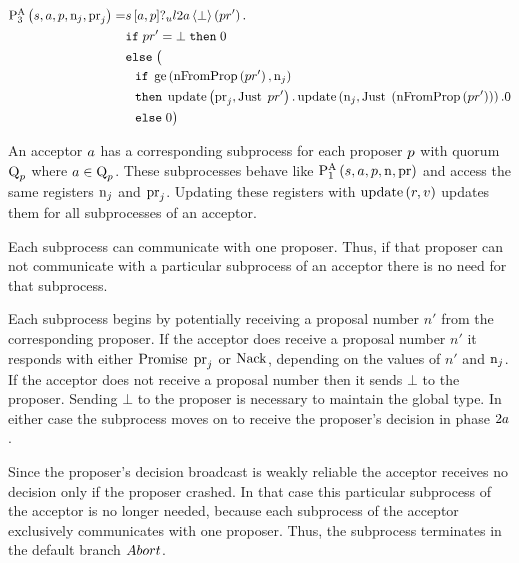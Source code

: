 \begin{align*}
\textstyle\operatorname{P^{A}_{3}}\left(
    s,
    a,
    p,
    \operatorname{n}_{j},
    \operatorname{pr}_{j}
\right) =
&
    s\left[a, p\right]?_u l2a \left\langle \bot \right\rangle \left(pr'\right).\\
&
    \mathtt{if}\; pr' = \bot \;\mathtt{then}\; 0\\
&
    \mathtt{else}\;
\big(
    \\
&\hspace*{0.75em * 1}
    \mathtt{if}\; \operatorname{ge}\left(\operatorname{nFromProp}\left(pr' \right), \operatorname{n}_{j}\right)\\
&\hspace*{0.75em * 1}
    \mathtt{then}\;
        \operatorname{update} \left(\operatorname{pr}_{j}, \operatorname{Just}\; pr'\right).
        \operatorname{update} \left(\operatorname{n}_{j}, \operatorname{Just}\; \left(\operatorname{nFromProp}\left(pr' \right)\right)\right).
        0\\
&\hspace*{0.75em * 1}
    \mathtt{else}\; 0
\big)
\end{align*}

An acceptor $a$ has a corresponding subprocess for each proposer $p$ with quorum $\operatorname{Q}_{p}$ where $a\in\operatorname{Q}_{p}$.
These subprocesses behave like $\textstyle\operatorname{P^{A}_{1}}\left(
    s,
    a,
    p,
    \operatorname{n},
    \operatorname{pr}
\right)$ and access the same registers $\operatorname{n}_{j}$ and $\operatorname{pr}_{j}$.
Updating these registers with $\operatorname{update} \left(r, v\right)$ updates them for all subprocesses of an acceptor.

Each subprocess can communicate with one proposer.
Thus, if that proposer can not communicate with a particular subprocess of an acceptor there is no need for that subprocess.

Each subprocess begins by potentially receiving a proposal number $n'$ from the corresponding proposer.
If the acceptor does receive a proposal number $n'$ it responds with either $\operatorname{Promise}\; \operatorname{pr}_{j}$ or $\operatorname{Nack}$, depending on the values of $n'$ and $\operatorname{n}_{j}$.
If the acceptor does not receive a proposal number then it sends $\bot$ to the proposer.
Sending $\bot$ to the proposer is necessary to maintain the global type.
In either case the subprocess moves on to receive the proposer's decision in phase $2a$.

Since the proposer's decision broadcast is weakly reliable the acceptor receives no decision only if the proposer crashed.
In that case this particular subprocess of the acceptor is no longer needed, because each subprocess of the acceptor exclusively communicates with one proposer.
Thus, the subprocess terminates in the default branch $\mathnormal{Abort}$.

